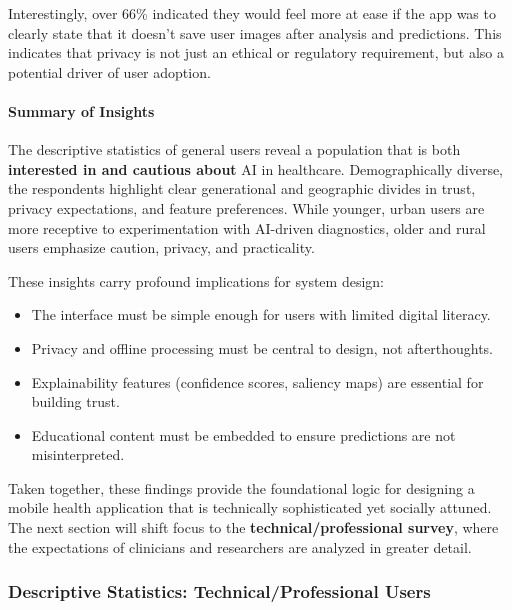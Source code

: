 \documentclass[
  12pt,
  oneside]{article}
\providecommand{\tightlist}{%
  \setlength{\itemsep}{0pt}\setlength{\parskip}{0pt}}
\begin{document}
Interestingly, over 66\% indicated they would feel more at ease if the
app was to clearly state that it doesn't save user images after analysis
and predictions. This indicates that privacy is not just an ethical or
regulatory requirement, but also a potential driver of user adoption.

\paragraph{Summary of Insights}\label{summary-of-insights}

The descriptive statistics of general users reveal a population that is
both \textbf{interested in and cautious about} AI in healthcare.
Demographically diverse, the respondents highlight clear generational
and geographic divides in trust, privacy expectations, and feature
preferences. While younger, urban users are more receptive to
experimentation with AI-driven diagnostics, older and rural users
emphasize caution, privacy, and practicality.

These insights carry profound implications for system design:

\begin{itemize}
\tightlist
\item
  The interface must be simple enough for users with limited digital
  literacy.\\
\item
  Privacy and offline processing must be central to design, not
  afterthoughts.\\
\item
  Explainability features (confidence scores, saliency maps) are
  essential for building trust.\\
\item
  Educational content must be embedded to ensure predictions are not
  misinterpreted.
\end{itemize}

Taken together, these findings provide the foundational logic for
designing a mobile health application that is technically sophisticated
yet socially attuned. The next section will shift focus to the
\textbf{technical/professional survey}, where the expectations of
clinicians and researchers are analyzed in greater detail.

\subsubsection{Descriptive Statistics: Technical/Professional
Users}\label{descriptive-statistics-technicalprofessional-users}
\end{document}
